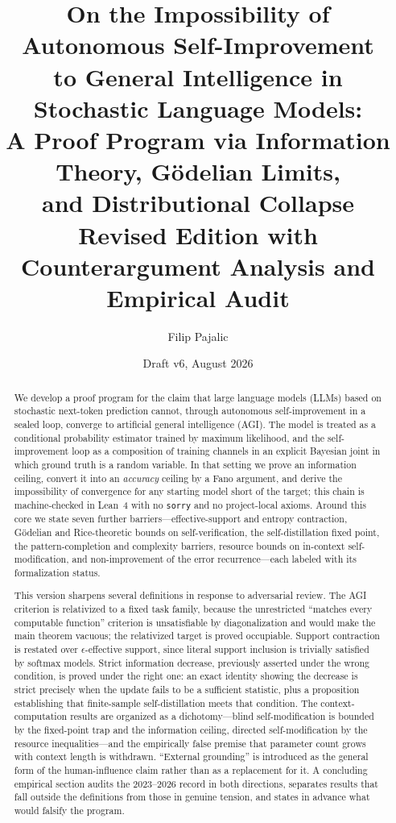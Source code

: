 \documentclass[11pt,a4paper]{article}
\title{\textbf{On the Impossibility of Autonomous Self-Improvement\\to General Intelligence in Stochastic Language Models:\\A Proof Program via Information Theory, G\"{o}delian Limits,\\and Distributional Collapse}\\[10pt]\large Revised Edition with Counterargument Analysis and Empirical Audit}
\author{Filip Pajalic}
\date{Draft v6, August 2026}
\begin{document}
\maketitle

\begin{abstract}
We develop a proof program for the claim that large language models (LLMs) based on stochastic next-token prediction cannot, through autonomous self-improvement in a sealed loop, converge to artificial general intelligence (AGI). The model is treated as a conditional probability estimator trained by maximum likelihood, and the self-improvement loop as a composition of training channels in an explicit Bayesian joint in which ground truth is a random variable. In that setting we prove an information ceiling, convert it into an \emph{accuracy} ceiling by a Fano argument, and derive the impossibility of convergence for any starting model short of the target; this chain is machine-checked in Lean~4 with no \texttt{sorry} and no project-local axioms. Around this core we state seven further barriers---effective-support and entropy contraction, G\"{o}delian and Rice-theoretic bounds on self-verification, the self-distillation fixed point, the pattern-completion and complexity barriers, resource bounds on in-context self-modification, and non-improvement of the error recurrence---each labeled with its formalization status.

This version sharpens several definitions in response to adversarial review. The AGI criterion is relativized to a fixed task family, because the unrestricted ``matches every computable function'' criterion is unsatisfiable by diagonalization and would make the main theorem vacuous; the relativized target is proved occupiable. Support contraction is restated over $\epsilon$-effective support, since literal support inclusion is trivially satisfied by softmax models. Strict information decrease, previously asserted under the wrong condition, is proved under the right one: an exact identity showing the decrease is strict precisely when the update fails to be a sufficient statistic, plus a proposition establishing that finite-sample self-distillation meets that condition. The context-computation results are organized as a dichotomy---blind self-modification is bounded by the fixed-point trap and the information ceiling, directed self-modification by the resource inequalities---and the empirically false premise that parameter count grows with context length is withdrawn. ``External grounding'' is introduced as the general form of the human-influence claim rather than as a replacement for it. A concluding empirical section audits the 2023--2026 record in both directions, separates results that fall outside the definitions from those in genuine tension, and states in advance what would falsify the program.
\end{abstract}
\end{document}
